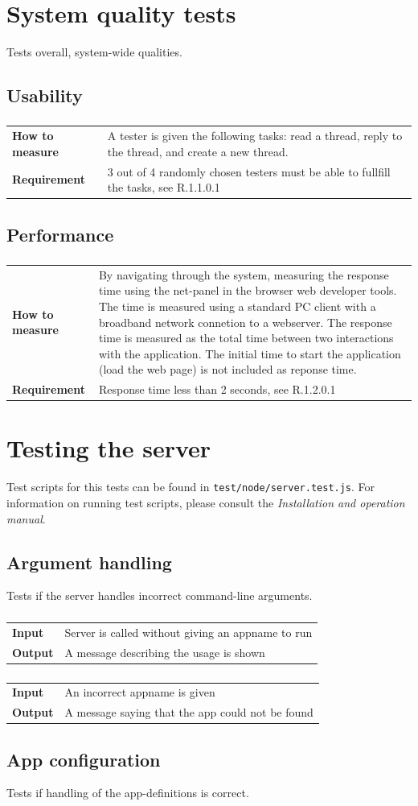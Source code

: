 \documentclass[a4paper, 12pt, titlepage]{article}
\newcommand{\urequirement}[2]{
	\subsubsection{}
	\begin{tabular}{l p{10cm}}
	\bf{How to measure} & 
		#1\\
	\bf{Requirement} & 
		#2\\
	\end{tabular}
}
\newcommand{\testcase}[2]{
	\subsubsection{}
	\begin{tabular}{l p{11cm}}
	\bf{Input} & 
		#1\\
	\bf{Output} & 
		#2\\
	\end{tabular}
}
\begin{document}
	\section{System quality tests}
	Tests overall, system-wide qualities.

	\subsection{Usability}
		\urequirement
		{
			A tester is given the following tasks: read a thread, reply to the thread, and create a new thread.
		}{
			3 out of 4 randomly chosen testers must be able to fullfill the tasks, see R.1.1.0.1
		}

	\subsection{Performance}
		\urequirement
		{
			By navigating through the system, measuring the response time using the net-panel in the browser web developer tools. The time is measured using a standard PC client with a broadband network connetion to a webserver.
			The response time is measured as the total time between two interactions with the application. The initial time to start the application (load the web page) is not included as reponse time.
		}{
			Response time less than 2 seconds, see R.1.2.0.1
		}

	\section{Testing the server}
	Test scripts for this tests can be found in \lstinline{test/node/server.test.js}. For information on running test scripts, please consult the \emph{Installation and operation manual}. 

	\subsection{Argument handling}
	Tests if the server handles incorrect command-line arguments.\\

		\testcase
		{
			Server is called without giving an appname to run
		}{
			A message describing the usage is shown
		}

		\testcase
		{
			An incorrect appname is given
		}{
			A message saying that the app could not be found
		}

	\subsection{App configuration}
	Tests if handling of the app-definitions is correct.\\
\end{document}
